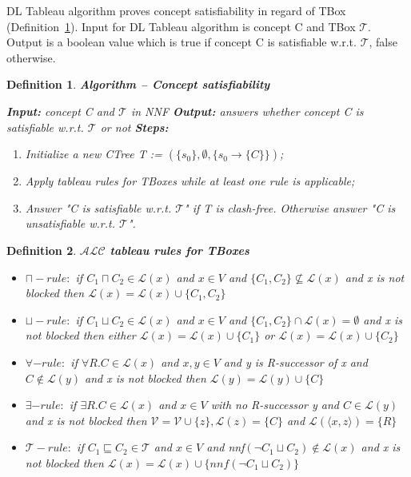 \documentclass[12pt,a4paper]{article}
\newtheorem{definition}{Definition}[subsection]
\begin{document}
DL Tableau algorithm proves concept satisfiability in regard of TBox (Definition~\ref{def:conceptSatisfiability}). Input for DL Tableau algorithm is concept C and TBox $\mathcal{T}$. Output is a boolean value which is true if concept C is satisfiable w.r.t. $\mathcal{T}$, false otherwise.

\begin{definition}{\textbf{Algorithm -- Concept satisfiability}}	
	\label{def:conceptSatisfiability}

	\textbf{Input:} concept C and $\mathcal{T}$ in NNF \newline
	\indent \textbf{Output:} answers whether concept C is satisfiable w.r.t. $\mathcal{T}$ or not \newline
	\indent \textbf{Steps:}
	\begin{enumerate}
		\item Initialize a new CTree T := $(\{s_{0}\}, \emptyset, \{s_{0} \rightarrow \{C\}\})$;
		\item Apply tableau rules for TBoxes while at least one rule is applicable;
		\item Answer "C is satisfiable w.r.t. $\mathcal{T}$" if T is clash-free. Otherwise answer "C is unsatisfiable w.r.t. $\mathcal{T}$".
	\end{enumerate}
\end{definition}

\begin{definition}{\textbf{$\mathcal{ALC}$ tableau rules for TBoxes}}
	\begin{itemize}
		\item $\sqcap-rule:$ if $C_{1} \sqcap C_{2} \in \mathcal{L}(x)$ and $x \in V$ and $\{ C_{1}, C_{2} \} \not \subseteq \mathcal{L}(x)$ and x is not blocked then $\mathcal{L}(x) = \mathcal{L}(x) \cup \{ C_{1}, C_{2} \}$
		
		\item $\sqcup-rule:$ if $C_{1} \sqcup C_{2} \in \mathcal{L}(x)$ and $x \in V$ and $ \{ C_{1}, C_{2} \} \cap \mathcal{L}(x) = \emptyset$ and x is not blocked then either $\mathcal{L}(x) = \mathcal{L}(x) \cup \{ C_{1} \}$ or $\mathcal{L}(x) = \mathcal{L}(x) \cup \{ C_{2} \}$
		
		\item $\forall-rule:$ if $\forall R.C \in \mathcal{L}(x)$ and $x,y \in V$ and y is R-successor of x and $C \not \in \mathcal{L}(y)$ and x is not blocked then $\mathcal{L}(y) = \mathcal{L}(y) \cup \{ C \}$
		
		\item $\exists-rule:$ if $\exists R.C \in \mathcal{L}(x)$ and $x \in V$ with no R-successor y and $C \in \mathcal{L}(y)$ and x is not blocked then $\mathcal{V} = \mathcal{V} \cup \{ z \}, \mathcal{L}(z) = \{ C\}$ and $\mathcal{L}( \langle x, z \rangle ) = \{ R \}$
		
		\item $\mathcal{T}-rule:$ if $C_{1} \sqsubseteq C_{2} \in \mathcal{T}$ and $x \in V$ and nnf$(\neg C_{1} \sqcup C_{2}) \not \in \mathcal{L}(x)$ and x is not blocked then $\mathcal{L}(x) = \mathcal{L}(x) \cup \{ nnf(\neg C_{1} \sqcup C_{2}) \}$
	\end{itemize}
\end{definition}	
\end{document}
